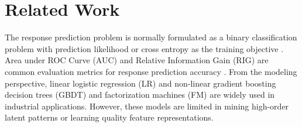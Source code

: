 \documentclass[conference]{IEEEtran}
\newcommand{\weinan}[1]{{\bf \color{red} [[Weinan says ``#1'']]}}
\begin{document}




\section{Related Work}\label{sec:related}
The response prediction problem is normally formulated as a binary classification problem with prediction likelihood or cross entropy as the training objective \cite{richardson2007predicting}.
Area under ROC Curve (AUC) and Relative Information Gain (RIG) are common evaluation metrics for response prediction accuracy \cite{graepel2010web}.
From the modeling perspective, linear logistic regression (LR) \cite{lee2012estimating,ren2016user} and non-linear gradient boosting decision trees (GBDT) \cite{he2014practical} and factorization machines (FM) \cite{ta2015factorization} are widely used in industrial applications. However, these models are limited in mining high-order latent patterns or learning quality feature representations.
\end{document}

